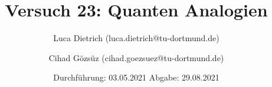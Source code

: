 

\subject{Fortgeschrittenenpraktikum der Fakultät Physik}
\title{Versuch 23: Quanten Analogien}
\author{Luca Dietrich (luca.dietrich@tu-dortmund.de) \and Cihad Gözsüz (cihad.goezsuez@tu-dortmund.de)}
\date{
  Durchführung: 03.05.2021
  \hspace{3em}
  Abgabe: 29.08.2021
}
\publishers{TU Dortmund – Fakultät Physik}



\maketitle
\thispagestyle{empty}
\tableofcontents
\newpage
\nocite{anleitung}





\newpage
\printbibliography{}
\nocite{matplotlib}
\nocite{seaborn}
\nocite{numpy}
\nocite{sympy}

